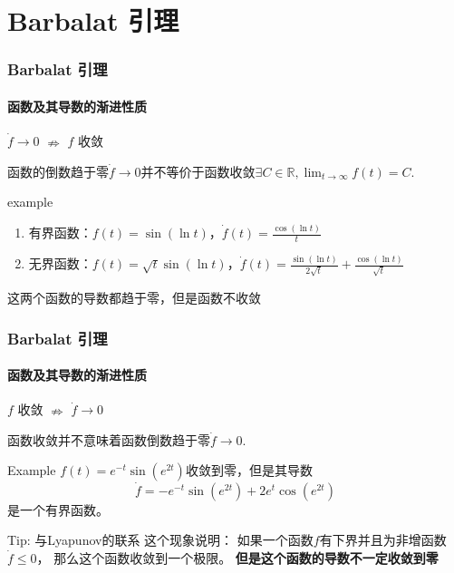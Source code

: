 \section{Barbalat 引理}

\begin{frame}
  \frametitle{Barbalat 引理}
  \framesubtitle{函数及其导数的渐进性质}
  $\dot{f}\to 0 $
  $\nRightarrow$
  $f$ 收敛

  函数的倒数趋于零$\dot{f}\to 0 $并不等价于函数收敛$\exists C\in\mathbb{R},\lim_{t\to\infty}f(t)=C$.

  \begin{block}{example}
    \begin{enumerate}
      \item 有界函数：$f(t)=\sin(\ln t)$，$\dot{f}(t)=\frac{\cos(\ln t)}{t}$
      \item 无界函数：$f(t)=\sqrt{t} \sin(\ln t)$，$\dot{f}(t)=\frac{\sin(\ln t)}{2 \sqrt{t}}+ \frac{\cos (\ln t)}{\sqrt{t}}$
    \end{enumerate}
    这两个函数的导数都趋于零，但是函数不收敛 
  \end{block}
\end{frame}

\begin{frame}
  \frametitle{Barbalat 引理}
  \framesubtitle{函数及其导数的渐进性质}

  $f$ 收敛
  $\nRightarrow$
  $\dot{f}\to 0 $

  函数收敛并不意味着函数倒数趋于零$\dot{f}\to 0$.

  \begin{block}{Example}
    $f(t)=e^{-t}\sin (e^{2t})$收敛到零，但是其导数
    \[
      \dot{f}=-e^{-t}\sin(e^{2t}) + 2 e^{t} \cos(e^{2t})
    \]
    是一个有界函数。
  \end{block}

  \begin{block}{Tip: 与Lyapunov的联系}
    这个现象说明：
    如果一个函数$f$有下界并且为非增函数$\dot{f}\leq 0$，
    那么这个函数收敛到一个极限。
    \textbf{但是这个函数的导数不一定收敛到零}
  \end{block}
\end{frame}


